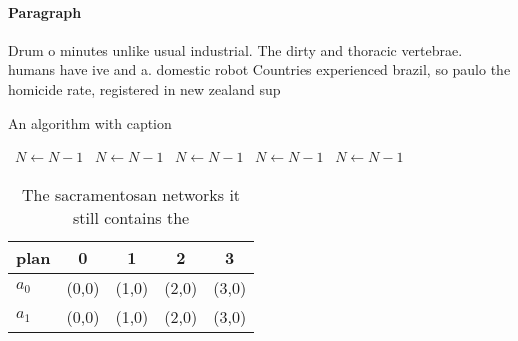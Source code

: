 \documentclass[a4paper]{article}
\begin{document}
\paragraph{Paragraph}
Drum o minutes unlike usual industrial. The dirty and thoracic vertebrae. humans have ive and a. domestic robot Countries experienced brazil, so paulo the homicide rate, registered in new zealand sup


\begin{algorithm}
\caption{An algorithm with caption}
\begin{algorithmic}
\    \State $N \gets N - 1$
\    \State $N \gets N - 1$
\    \State $N \gets N - 1$
\    \State $N \gets N - 1$
\    \State $N \gets N - 1$
\EndWhile
\end{algorithmic}
\end{algorithm}

\begin{table}
\begin{adjustbox}{width=0.6\columnwidth}
\begin{tabular}{|l|l|l|l|l|}
\hline
\textbf{plan} & \multicolumn{1}{c|}{\textbf{0}} & \multicolumn{1}{c|}{\textbf{1}} & \multicolumn{1}{c|}{\textbf{2}} & \multicolumn{1}{c|}{\textbf{3}} \\ \hline
\textbf{$a_0$}  & (0,0) & (1,0) & (2,0) & (3,0) \\ \hline
\textbf{$a_1$}  & (0,0) & (1,0) & (2,0) & (3,0) \\ \hline
\end{tabular}
\end{adjustbox}
\caption{The sacramentosan networks it still contains the 
}
\end{table}
\end{document}

